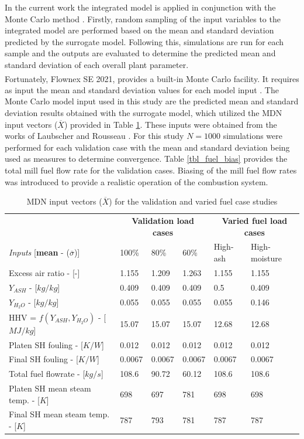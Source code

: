 \documentclass[a4paper,fleqn]{cas-sc}
\begin{document}
In the current work the integrated model is applied in conjunction with the Monte Carlo method \cite{Thomopoulos2013}. Firstly, random sampling of the input variables to the integrated model are performed based on the mean and standard deviation predicted by the surrogate model.  Following this, simulations are run for each sample and the outputs are evaluated to determine the predicted mean and standard deviation of each overall plant parameter.\\

Fortunately, Flownex SE\textsuperscript{\textregistered} 2021, provides a built-in Monte Carlo facility. It requires as input the mean and standard deviation values for each model input \cite{flownex}. The Monte Carlo model input used in this study are the predicted mean and standard deviation results obtained with the surrogate model, which utilized the MDN input vectors ($\overline{X}$) provided in Table \ref{tbl_inputs}. These inputs were obtained from the works of Laubscher and Rousseau \cite{Laubscher2019b}. For this study $N=1000$ simulations were performed for each validation case with the mean and standard deviation being used as measures to determine convergence. Table \ref{tbl_fuel_bias} provides the total mill fuel flow rate for the validation cases. Biasing of the mill fuel flow rates was introduced to provide a realistic operation of the combustion system.\\

\begin{table}[h!]
\caption{MDN input vectors ($\overline{X}$) for the validation and varied fuel case studies}\label{tbl_inputs}
\begin{tabular*}{\tblwidth}{lp{}p{}p{}p{}p{}}
\toprule
 & \multicolumn{3}{c}{\textbf{Validation load cases}}&\multicolumn{2}{c}{\textbf{Varied fuel load cases}}\\
\textit{Inputs} [\textbf{mean} - ($\overline{\sigma}$)]& 100\%  & 80\% & 60\% & High-ash & High-moisture  \\
\midrule
Excess air ratio - [-] & 1.155 & 1.209 & 1.263 & 1.155 & 1.155  \\
$Y_{ASH}$ - [$kg/kg$] & 0.409 & 0.409 &  0.409 &0.5 & 0.409 \\
$Y_{H_{2}O}$ - [$kg/kg$] & 0.055 & 0.055 & 0.055 & 0.055 & 0.146  \\
HHV = $f(Y_{ASH},Y_{H_{2}O})$ - [$MJ/kg$] & 15.07 & 15.07 & 15.07 & 12.68 & 12.68  \\
Platen SH fouling - [$K/W$]& 0.012 & 0.012 & 0.012 & 0.012 & 0.012  \\
Final SH fouling - [$K/W$] & 0.0067&0.0067 &0.0067 & 0.0067&0.0067  \\
Total fuel flowrate - [$kg/s$] &108.6 & 90.72 & 60.12 &108.6 & 108.6 \\
Platen SH mean steam temp. - [$K$] & 698 &697&781 &698 &698  \\
Final SH mean steam temp. - [$K$]& 787 & 793 &781 &787 &787  \\
\bottomrule
\end{tabular*}
\end{table}  
\end{document}
